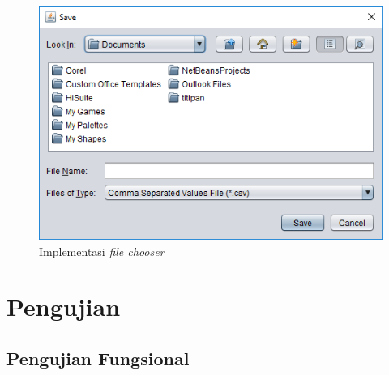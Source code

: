 \begin{figure}[H]
				\centering		
				\includegraphics[scale=0.7]{Gambar/gui2.png}
				\caption[Implementasi \textit{file chooser}]{Implementasi \textit{file chooser}}
				\label{fig:implementasifilechooser}	
			\end{figure}
			
\section{Pengujian}
\label{sec:pengujian}

\subsection{Pengujian Fungsional}
\label{subsec:pengujianfungsional}

